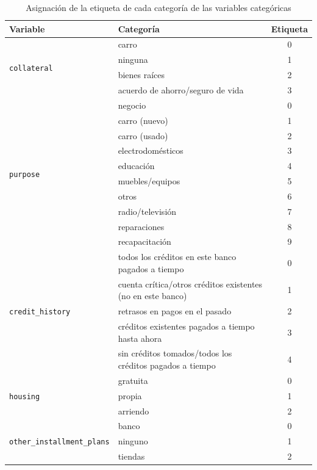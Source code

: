 \documentclass{ieeeaccess}
\begin{document}
\begin{table}[!t]
  \caption{Asignación de la etiqueta de cada categoría de las variables categóricas}
  \label{tab:label_categorical}
  \centering
  \begin{tabular}{llc}
    \toprule
    Variable & Categoría & Etiqueta \\
    \midrule
    \multirow{4}{*}{\texttt{collateral}}
      & carro & 0 \\
      & ninguna & 1 \\
      & bienes raíces & 2 \\
      & acuerdo de ahorro/seguro de vida & 3 \\
    \midrule
    \multirow{10}{*}{\texttt{purpose}}
      & negocio & 0 \\
      & carro (nuevo) & 1 \\
      & carro (usado) & 2 \\
      & electrodomésticos & 3 \\
      & educación & 4 \\
      & muebles/equipos & 5 \\
      & otros & 6 \\
      & radio/televisión & 7 \\
      & reparaciones & 8 \\
      & recapacitación & 9 \\
    \midrule
    \multirow{5}{*}{\texttt{credit\_history}}
      & todos los créditos en este banco pagados a tiempo & 0 \\
      & cuenta crítica/otros créditos existentes (no en este banco) & 1 \\
      & retrasos en pagos en el pasado & 2 \\
      & créditos existentes pagados a tiempo hasta ahora & 3 \\
      & sin créditos tomados/todos los créditos pagados a tiempo & 4 \\
    \midrule
    \multirow{3}{*}{\texttt{housing}}
      & gratuita & 0 \\
      & propia & 1 \\
      & arriendo & 2 \\
    \midrule
    \multirow{3}{*}{\texttt{other\_installment\_plans}}
      & banco & 0 \\
      & ninguno & 1 \\
      & tiendas & 2 \\
    \bottomrule
  \end{tabular}
\end{table}
\end{document}
